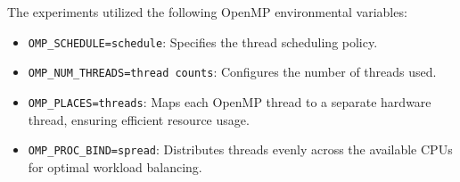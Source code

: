 The experiments utilized the following OpenMP environmental variables:
\begin{itemize}
    \item \texttt{OMP\_SCHEDULE={schedule}}: Specifies the thread scheduling policy.
    \item \texttt{OMP\_NUM\_THREADS={thread counts}}: Configures the number of threads used.
    \item \texttt{OMP\_PLACES=threads}: Maps each OpenMP thread to a separate hardware thread, ensuring efficient resource usage.
    \item \texttt{OMP\_PROC\_BIND=spread}: Distributes threads evenly across the available CPUs for optimal workload balancing.
\end{itemize}
